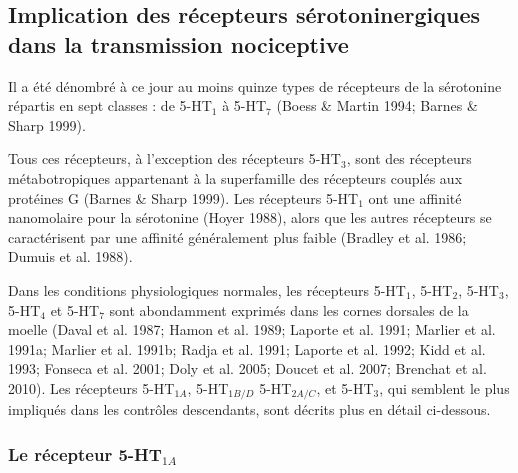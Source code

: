 \documentclass[a4paper,12pt,twoside]{report}
\begin{document}
\begin{table}

 \label{Tableau 1}
\end{table}

\subsection{Implication des récepteurs sérotoninergiques dans la transmission nociceptive}
\label{Implication des récepteurs 5-HT dans la transmission nociceptive}

Il a été dénombré à ce jour au moins quinze types de récepteurs de la sérotonine répartis en sept classes : de 5-HT$_{1}$ à 5-HT$_{7}$ (Boess \& Martin 1994; Barnes \& Sharp 1999).

Tous ces récepteurs, à l’exception des récepteurs 5-HT$_{3}$, sont des récepteurs métabotropiques appartenant à la superfamille des récepteurs couplés aux protéines G (Barnes \& Sharp 1999). Les récepteurs 5-HT$_{1}$ ont une affinité nanomolaire pour la sérotonine (Hoyer 1988), alors que les autres récepteurs se caractérisent par une affinité généralement plus faible (Bradley et al. 1986; Dumuis et al. 1988).

Dans les conditions physiologiques normales, les récepteurs 5-HT$_{1}$, 5-HT$_{2}$, 5-HT$_{3}$, 5-HT$_{4}$ et 5-HT$_{7}$ sont abondamment exprimés dans les cornes dorsales de la moelle (Daval et al. 1987; Hamon et al. 1989; Laporte et al. 1991; Marlier et al. 1991a; Marlier et al. 1991b; Radja et al. 1991; Laporte et al. 1992; Kidd et al. 1993; Fonseca et al. 2001; Doly et al. 2005; Doucet et al. 2007; Brenchat et al. 2010). Les récepteurs 5-HT$_{1A}$, 5-HT$_{1B/D}$ 5-HT$_{2A/C}$, et 5-HT$_{3}$, qui semblent le plus impliqués dans les contrôles descendants, sont décrits plus en détail ci-dessous.

\subsubsection{Le récepteur 5-HT$_{1A}$}
\end{document}
